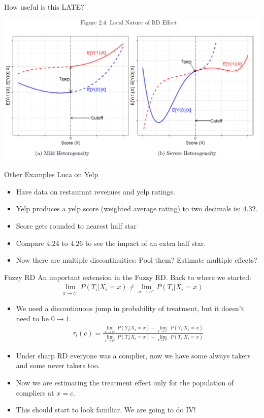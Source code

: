\begin{frame}{How useful is this LATE?}
  \pause
  \begin{center}
  \includegraphics[width=\textwidth]{./resources/CatteneoLocal}
  \end{center}
\end{frame}

\begin{frame}{Other Examples}
Luca on Yelp
\begin{itemize}
\item Have data on restaurant revenues and yelp ratings.
\item Yelp produces a yelp score (weighted average rating) to two decimals ie: $4.32$.
\item Score gets rounded to nearest half star
\item Compare $4.24$ to $4.26$ to see the impact of an extra half star.
\item Now there are multiple discontinuities: Pool them? Estimate multiple effects?
\end{itemize}
\end{frame}

\begin{frame}{Fuzzy RD}
An important extension in the \alert{Fuzzy RD}.   Back to where we started:
\begin{eqnarray*}
\lim_{x\rightarrow c^{+}} P(T_i | X_i = x) \neq \lim_{x\rightarrow c^{-}}P(T_i | X_i = x)
\end{eqnarray*}
\begin{itemize}
\item We need a discontinuous jump in probability of treatment, but it doesn't need to be $0 \rightarrow 1$.
\begin{eqnarray*}
\tau_i(c) = \frac{\lim_{x\rightarrow c^{+}} P(Y_i | X_i = x) - \lim_{x\rightarrow c^{-}}P(Y_i | X_i = x)}{\lim_{x\rightarrow c^{+}} P(T_i | X_i = x) - \lim_{x\rightarrow c^{-}}P(T_i | X_i = x)}
\end{eqnarray*}
\item Under sharp RD everyone was a \alert{complier}, now we have some \alert{always takers} and some \alert{never takers} too.
\item Now we are estimating the treatment effect only for the population of compliers at $x=c$.
\item This should start to look familiar. We are going to do IV!
\end{itemize}
\end{frame}

